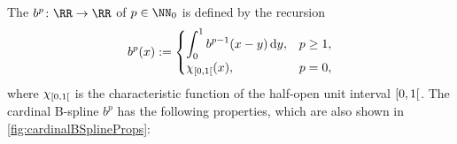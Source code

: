 %
%
%
The 
$b^p\colon \RR \to \RR$ of  $p \in \NN_0$
is defined by the recursion
\begin{equation}
  \label{eq:cardinalBSpline}
  b^p(x)
  :=
  \begin{cases}
    \displaystyle\int_0^1 b^{p-1}(x - y) \mathop{}\!\mathrm{d}{}y,&p \ge 1,\\
    \chi_{\mathopen[0, 1\mathclose[}(x),&p = 0,
  \end{cases}
\end{equation}
where $\chi_{\mathopen[0, 1\mathclose[}$ is the characteristic function of
the half-open unit interval $\mathopen[0, 1\mathclose[$.
The cardinal B-spline $b^p$ has the following properties,
which are also shown in \cref{fig:cardinalBSplineProps}:
